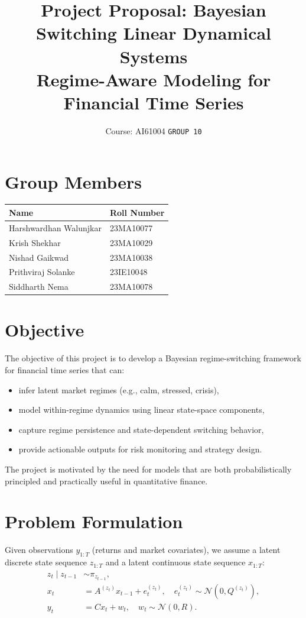 \documentclass[11pt]{article}
\title{Project Proposal: Bayesian Switching Linear Dynamical Systems\\
\large Regime-Aware Modeling for Financial Time Series}
\author{Course: AI61004 \quad \texttt{GROUP 10}}
\begin{document}
\maketitle

\section*{Group Members}
\begin{table}[h!]
\centering
\begin{tabular}{p{8cm} p{4cm}}
\toprule
\textbf{Name} & \textbf{Roll Number} \\
\midrule
Harshwardhan Walunjkar & 23MA10077 \\
Krish Shekhar & 23MA10029 \\
Nishad Gaikwad & 23MA10038 \\
Prithviraj Solanke & 23IE10048 \\
Siddharth Nema & 23MA10078 \\
\bottomrule
\end{tabular}
\end{table}

\section{Objective}
The objective of this project is to develop a Bayesian regime-switching framework for financial time series that can:
\begin{itemize}[leftmargin=1.5em]
    \item infer latent market regimes (e.g., calm, stressed, crisis),
    \item model within-regime dynamics using linear state-space components,
    \item capture regime persistence and state-dependent switching behavior,
    \item provide actionable outputs for risk monitoring and strategy design.
\end{itemize}
The project is motivated by the need for models that are both probabilistically principled and practically useful in quantitative finance.

\section{Problem Formulation}
Given observations $y_{1:T}$ (returns and market covariates), we assume a latent discrete state sequence $z_{1:T}$ and a latent continuous state sequence $x_{1:T}$:
\begin{align}
z_t \mid z_{t-1} &\sim \pi_{z_{t-1}},\\
x_t &= A^{(z_t)}x_{t-1} + e_t^{(z_t)}, \quad e_t^{(z_t)} \sim \mathcal{N}(0,Q^{(z_t)}),\\
y_t &= Cx_t + w_t, \quad w_t \sim \mathcal{N}(0,R).
\end{align}
\end{document}
